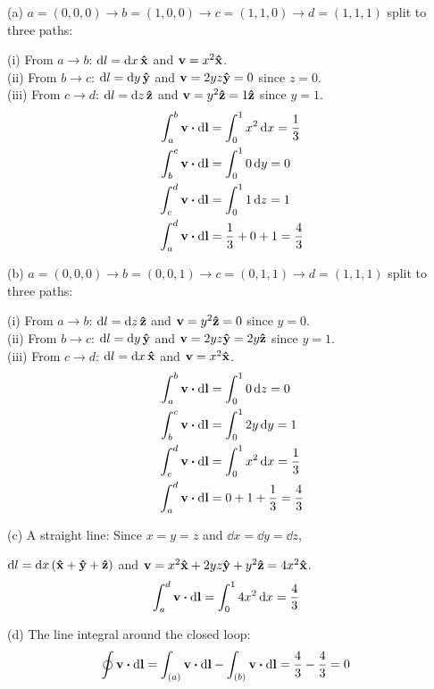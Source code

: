 \documentclass[../main.tex]{subfiles}
\begin{document}
(a) $a = (0,0,0) \to b = (1,0,0) \to c = (1,1,0) \to d = (1,1,1)$ split to three paths:

(i)   From $a \to b$: $\dd{l} = \dd{x} \vu{x}$ and $\vb{v} = x^2 \vu{x}$. \\
(ii)  From $b \to c$: $\dd{l} = \dd{y} \vu{y}$ and $\vb{v} = 2yz \vu{y} = 0$ since $z=0$. \\
(iii) From $c \to d$: $\dd{l} = \dd{z} \vu{z}$ and $\vb{v} = y^2 \vu{z} = 1\vu{z}$ since $y=1$.
\begin{align*}
    \int_a^b \vb{v} \vdot \dd{\vb{l}} &= \int_0^1 x^2 \dd{x} = \frac{1}{3} \\
    \int_b^c \vb{v} \vdot \dd{\vb{l}} &= \int_0^1 0 \dd{y} = 0 \\
    \int_c^d \vb{v} \vdot \dd{\vb{l}} &= \int_0^1 1 \dd{z} = 1 \\
    \int_a^d \vb{v} \vdot \dd{\vb{l}} &= \frac{1}{3} + 0 + 1 = \frac{4}{3}
\end{align*}

(b) $a= (0,0,0) \to b = (0,0,1) \to c = (0,1,1) \to d = (1,1,1)$ split to three paths:

(i)   From $a \to b$: $\dd{l} = \dd{z} \vu{z}$ and $\vb{v} = y^2 \vu{z} = 0$ since $y=0$. \\
(ii)  From $b \to c$: $\dd{l} = \dd{y} \vu{y}$ and $\vb{v} = 2yz \vu{y} = 2y \vu{z}$ since $y=1$. \\
(iii) From $c \to d$: $\dd{l} = \dd{x} \vu{x}$ and $\vb{v} = x^2 \vu{x}$.
\begin{align*}
    \int_a^b \vb{v} \vdot \dd{\vb{l}} &= \int_0^1 0 \dd{z} = 0 \\
    \int_b^c \vb{v} \vdot \dd{\vb{l}} &= \int_0^1 2y \dd{y} = 1 \\
    \int_c^d \vb{v} \vdot \dd{\vb{l}} &= \int_0^1 x^2 \dd{x} = \frac{1}{3} \\
    \int_a^d \vb{v} \vdot \dd{\vb{l}} &= 0 + 1 + \frac{1}{3} = \frac{4}{3}
\end{align*}

(c) A straight line: Since $x = y = z$ and $\dd{x} = \dd{y} = \dd{z}$,

$\dd{l} = \dd{x} (\vu{x} + \vu{y} + \vu{z})$
and $\vb{v} = x^2 \vu{x} + 2yz \vu{y} + y^2 \vu{z} = 4x^2 \vu{x}$.
\begin{align*}
    \int_a^d \vb{v} \vdot \dd{\vb{l}} &= \int_0^1 4x^2 \dd{x} = \frac{4}{3}
\end{align*}

(d) The line integral around the closed loop:
\begin{align*}
    \oint \vb{v} \vdot \dd{\vb{l}} &= \int_{(a)} \vb{v} \vdot \dd{\vb{l}}
        - \int_{(b)} \vb{v} \vdot \dd{\vb{l}}  = \frac{4}{3} - \frac{4}{3} = 0
\end{align*}
\end{document}
